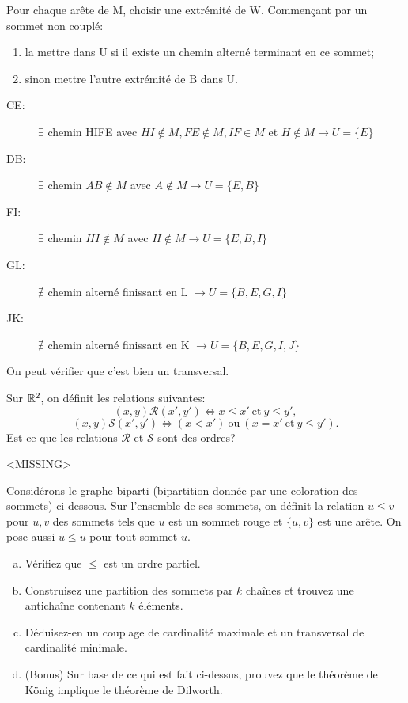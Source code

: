 Pour chaque arête de M, choisir une extrémité de W. Commençant par un sommet non couplé:

\begin{enumerate}[$\rightarrow$]
\item la mettre dans U si il existe un chemin alterné terminant en ce sommet;
\item sinon mettre l'autre extrémité de B dans U.
\end{enumerate}

\begin{description}
\item[CE:] $\exists$ chemin HIFE avec $HI \notin M, FE \notin M, IF \in M$ et $H \notin M \rightarrow U=\{ E\}$
\item[DB:] $\exists$ chemin $AB \notin M$ avec $A \notin M \rightarrow U= \{ E,B\}$
\item[FI:] $\exists$ chemin $HI \notin M$ avec $H \notin M \rightarrow U= \{ E,B,I\}$
\item[GL:] $\nexists$ chemin alterné finissant en L $\rightarrow U= \{ B,E,G,I\}$
\item[JK:] $\nexists$ chemin alterné finissant en K $\rightarrow U= \{ B,E,G,I,J\}$
\end{description}

On peut vérifier que c'est bien un transversal.

\newpage


\begin{exo}
Sur $\mathbb{R}^2$, on d\'efinit les relations suivantes:
\[(x,y)\mathcal{R}(x',y') \Leftrightarrow x \leq x' \mathrm{~et~} y \leq y', \]
\[(x,y)\mathcal{S}(x',y') \Leftrightarrow (x < x') \mathrm{~ou~} (x = x' \mathrm{~et~} y \leq y').\]
Est-ce que les relations $\mathcal{R}$ et $\mathcal{S}$ sont des ordres?
\end{exo}

<MISSING>


\begin{exo}
Consid\'erons le graphe biparti (bipartition donn\'ee par une coloration des sommets) ci-dessous. Sur l'ensemble de ses sommets, on d\'efinit la relation $u\leq v$ pour $u,v$ des sommets tels que $u$ est un sommet rouge et $\{u,v\}$ est une ar\^ete. On pose aussi $u\leq u$ pour tout sommet $u$. \\
\begin{enumerate}[(a)]
\item V\'erifiez que $\leq$ est un ordre partiel.
\item Construisez une partition des sommets par $k$ cha\^ines et trouvez une anticha\^ine contenant $k$ \'el\'ements.
\item D\'eduisez-en un couplage de cardinalit\'e maximale et un transversal de cardinalit\'e minimale. 
\item (Bonus) Sur base de ce qui est fait ci-dessus, prouvez que le th\'eor\`eme de K\"onig implique le th\'eor\`eme de Dilworth.
\end{enumerate}
\end{exo}

